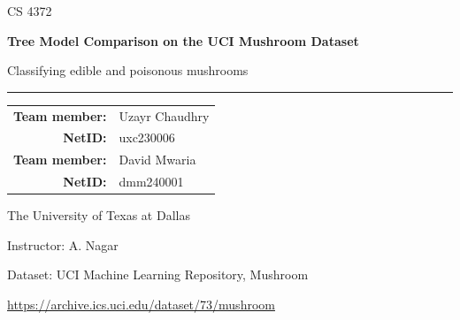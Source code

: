 \documentclass[11pt]{article}
\begin{document}
\begin{titlepage}
  \thispagestyle{empty}
  \centering
  \vspace*{1.15in}

  {\Large\textcolor{accent}{CS 4372}\par}
  \vspace{0.35in}
  {\Huge\bfseries Tree Model Comparison on the UCI Mushroom Dataset\par}
  \vspace{0.25in}
  {\Large Classifying edible and poisonous mushrooms\par}

  \vspace{0.55in}
  \rule{0.78\textwidth}{0.6pt}
  \vspace{0.5in}

  {\large
  \begin{tabular}{>{\bfseries}rl}
    Team member: & Uzayr Chaudhry \\
    NetID: & uxc230006 \\
    \addlinespace[0.3em]
    Team member: & David Mwaria \\
    NetID: & dmm240001 \\
  \end{tabular}
  \par}

  \vfill
  {\large The University of Texas at Dallas\par}
  \vspace{0.12in}
  {\large Instructor: A. Nagar\par}
  \vspace{0.4in}
  {\small Dataset: UCI Machine Learning Repository, Mushroom\par}
  {\small\url{https://archive.ics.uci.edu/dataset/73/mushroom}\par}
\end{titlepage}


\begin{abstract}
Four tree methods achieve perfect classification and ranking on the Mushroom test set. The central result is not an ensemble advantage: a small set of categorical rules already separates these labels. We test conditional feature removal, trace rare Decision Tree paths, and distinguish probability quality from classification. Every test row repeats a training combination of the five selected traits. A stress test holds groups defined by those traits apart, while refitting feature selection within each fold. All four methods then miss the same three positive odorless profiles. XGBoost reduces false positives, but does not recover these exceptions. The main finding is that strong aggregate scores can conceal complete failure on a small subgroup.
\end{abstract}
\end{document}
